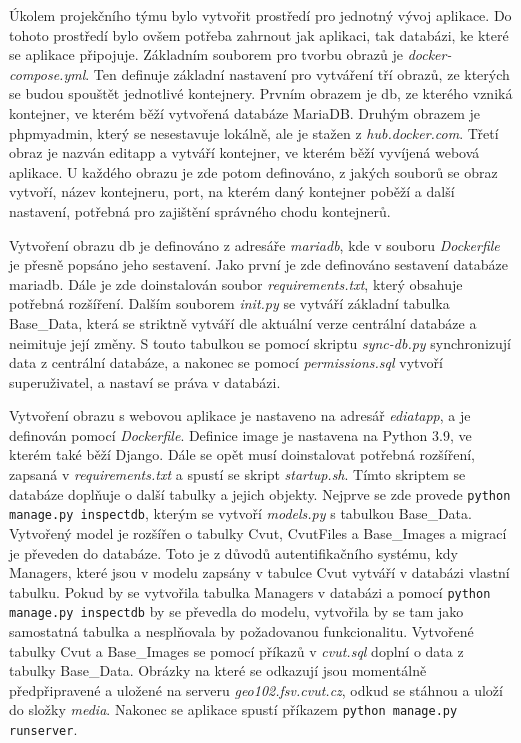 Úkolem projekčního týmu bylo vytvořit prostředí pro jednotný vývoj
aplikace. Do tohoto prostředí bylo ovšem potřeba zahrnout jak aplikaci,
tak databázi, ke které se aplikace připojuje. Základním souborem pro
tvorbu obrazů je \emph{docker-compose.yml}. Ten definuje základní
nastavení pro vytváření tří obrazů, ze kterých se budou spouštět
jednotlivé kontejnery. Prvním obrazem je db, ze kterého vzniká
kontejner, ve kterém běží vytvořená databáze MariaDB. Druhým obrazem
je phpmyadmin, který se nesestavuje lokálně, ale je stažen z
\emph{hub.docker.com}. Třetí obraz je nazván editapp a vytváří kontejner, ve
kterém běží vyvíjená webová aplikace. U každého obrazu je zde potom
definováno, z jakých souborů se obraz vytvoří, název kontejneru, port,
na kterém daný kontejner poběží a další nastavení, potřebná pro
zajištění správného chodu kontejnerů.

Vytvoření obrazu db je definováno z adresáře \emph{mariadb}, kde v
souboru \emph{Dockerfile} je přesně popsáno jeho sestavení. Jako první
je zde definováno sestavení databáze mariadb. Dále je zde doinstalován
soubor \emph{requirements.txt}, který obsahuje potřebná
rozšíření. Dalším souborem \emph{init.py} se vytváří základní tabulka
Base\_Data, která se striktně vytváří dle aktuální verze centrální
databáze a neimituje její změny. S touto tabulkou se pomocí skriptu
\emph{sync-db.py} synchronizují data z centrální databáze, a nakonec
se pomocí \emph{permissions.sql} vytvoří superuživatel, a nastaví se
práva v databázi.

Vytvoření obrazu s webovou aplikace je nastaveno na adresář
\emph{ediatapp}, a je definován pomocí \emph{Dockerfile}. Definice
image je nastavena na Python 3.9, ve kterém také běží Django. Dále se
opět musí doinstalovat potřebná rozšíření, zapsaná v
\emph{requirements.txt} a spustí se skript \emph{startup.sh}. Tímto
skriptem se databáze doplňuje o další tabulky a jejich
objekty. Nejprve se zde provede {\tt python manage.py inspectdb}, kterým se vytvoří
\emph{models.py} s tabulkou Base\_Data. Vytvořený model je rozšířen o
tabulky Cvut, CvutFiles a Base\_Images a migrací je převeden do
databáze. Toto je z důvodů autentifikačního systému, kdy Managers,
které jsou v modelu zapsány v tabulce Cvut vytváří v databázi vlastní
tabulku. Pokud by se vytvořila tabulka Managers v databázi a pomocí
 {\tt python manage.py inspectdb} by se převedla do modelu, vytvořila by se tam jako
samostatná tabulka a nesplňovala by požadovanou
funkcionalitu. Vytvořené tabulky Cvut a Base\_Images se pomocí 
příkazů v \emph{cvut.sql} doplní o data z tabulky Base\_Data. Obrázky
na které se odkazují jsou momentálně předpřipravené a uložené na
serveru \emph{geo102.fsv.cvut.cz}, odkud se stáhnou a uloží do složky
\emph{media}. Nakonec se aplikace spustí příkazem  {\tt python manage.py runserver}.


